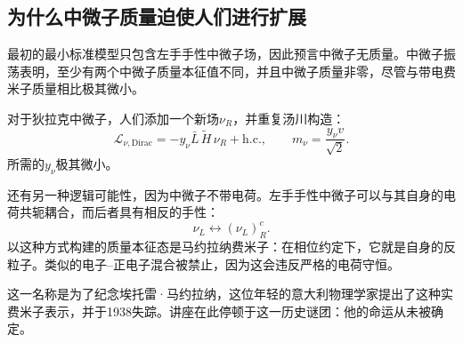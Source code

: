 \subsection{为什么中微子质量迫使人们进行扩展}

最初的最小标准模型只包含左手手性中微子场，因此预言中微子无质量。中微子振荡表明，至少有两个中微子质量本征值不同，并且中微子质量非零，尽管与带电费米子质量相比极其微小。

\begin{classroomqa}
\end{classroomqa}

对于狄拉克中微子，人们添加一个新场\(\nu_R\)，并重复汤川构造：
\begin{equation}
  \mathcal L_{\nu,\mathrm{Dirac}}
  =-y_\nu\bar L\,\widetilde H\,\nu_R+\mathrm{h.c.},
  \qquad
  m_\nu=\frac{y_\nu v}{\sqrt2}.
  \label{eq:l09-dirac-neutrino}
\end{equation}
所需的\(y_\nu\)极其微小。

还有另一种逻辑可能性，因为中微子不带电荷。左手手性中微子可以与其自身的电荷共轭耦合，而后者具有相反的手性：
\begin{equation}
  \nu_L\longleftrightarrow(\nu_L)^c_R .
  \label{eq:l09-majorana-mixing}
\end{equation}
以这种方式构建的质量本征态是马约拉纳费米子：在相位约定下，它就是自身的反粒子。类似的电子--正电子混合被禁止，因为这会违反严格的电荷守恒。

\begin{classroomqa}
\end{classroomqa}

这一名称是为了纪念埃托雷·马约拉纳，这位年轻的意大利物理学家提出了这种实费米子表示，并于1938失踪。讲座在此停顿于这一历史谜团：他的命运从未被确定。

